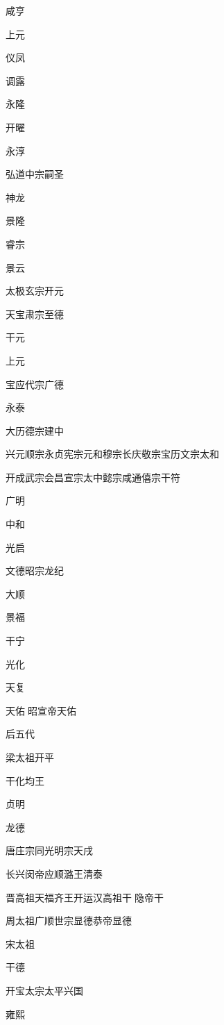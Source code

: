 \documentclass[a4paper,12pt,UTF8,twoside]{ctexbook}
\begin{document}
    咸亨
    
    上元
    
    仪凤
    
    调露
    
    永隆
    
    开曜
    
    永淳
    
    弘道中宗嗣圣
    
    神龙
    
    景隆
    
    睿宗
    
    景云
    
    太极玄宗开元
    
    天宝肃宗至德
    
    干元
    
    上元
    
    宝应代宗广德
    
    永泰
    
    大历德宗建中
    
    兴元顺宗永贞宪宗元和穆宗长庆敬宗宝历文宗太和
    
    开成武宗会昌宣宗太中懿宗咸通僖宗干符
    
    广明
    
    中和
    
    光启
    
    文德昭宗龙纪
    
    大顺
    
    景福
    
    干宁
    
    光化
    
    天复
    
    天佑昭宣帝天佑
    
    后五代
    
    梁太祖开平
    
    干化均王
    
    贞明
    
    龙德
    
    唐庄宗同光明宗天戌
    
    长兴闵帝应顺潞王清泰
    
    晋高祖天福齐王开运汉高祖干隐帝干
    
    周太祖广顺世宗显德恭帝显德
    
    宋太祖
    
    干德
    
    开宝太宗太平兴国
    
    雍熙
    
\end{document}

